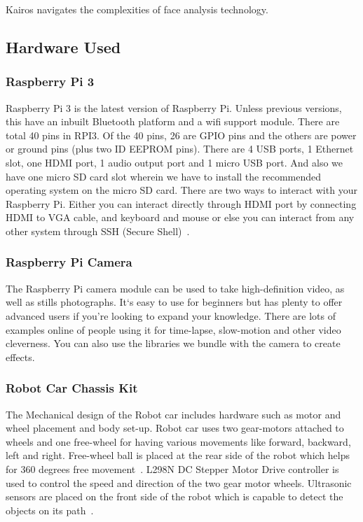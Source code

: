 Kairos navigates the complexities of face analysis technology.

\subsection{Hardware Used}
\subsubsection{Raspberry Pi 3}
Raspberry Pi 3 is the latest version of Raspberry Pi. Unless previous 
versions, this have an inbuilt Bluetooth platform and a wifi support 
module. There are total 40 pins in RPI3. Of the 40 pins, 26 are GPIO 
pins and the others are power or ground pins (plus two ID EEPROM pins). 
There are 4 USB ports, 1 Ethernet slot, one HDMI port, 1 audio output port 
and 1 micro USB port. And also we have one micro SD card slot wherein we 
have to install the recommended operating system on the micro SD card. 
There are two ways to interact with your Raspberry Pi. Either you can 
interact directly through HDMI port by connecting HDMI to VGA cable, and 
keyboard and mouse or else you can interact from any other system through 
SSH (Secure Shell)~\cite{deligence2017}.

\subsubsection{Raspberry Pi Camera}
The Raspberry Pi camera module can be used to take high-definition video, 
as well as stills photographs. It`s easy to use for beginners but has 
plenty to offer advanced users if you’re looking to expand your knowledge. 
There are lots of examples online of people using it for time-lapse, 
slow-motion and other video cleverness. You can also use the libraries we 
bundle with the camera to create effects.

\subsubsection{Robot Car Chassis Kit}
The Mechanical design of the Robot car includes hardware such as motor and 
wheel placement and body set-up. Robot car uses two gear-motors attached to 
wheels and one free-wheel for having various movements like forward, 
backward, left and right. Free-wheel ball is placed at the rear side of the 
robot which helps for 360 degrees free movement~\cite{arduino2015}. L298N 
DC Stepper Motor Drive controller is used to control the speed and direction 
of the two gear motor wheels. Ultrasonic sensors are placed on the front 
side of the robot which is capable to detect the objects on its 
path~\cite{gregor2017}.



